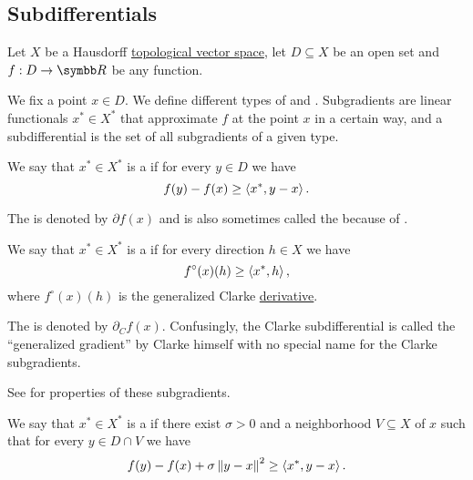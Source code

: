 \subsection{Subdifferentials}\label{subsec:subdifferentials}

Let \( X \) be a Hausdorff \hyperref[def:topological_vector_space]{topological vector space}, let \( D \subseteq X \) be an open set and \( f: D \to \BR \) be any function.

\begin{definition}\label{def:subdifferentials}
  We fix a point \( x \in D \). We define different types of  and . Subgradients are linear functionals \( x^* \in X^* \) that approximate \( f \) at the point \( x \) in a certain way, and a subdifferential is the set of all subgradients of a given type.

  \begin{defenum}
    \cite[59]{Clarke2013} We say that \( x^* \in X^* \) is a  if for every \( y \in D \) we have
    \begin{equation*}
      f(y) - f(x) \geq \left\langle x^*, y - x \right\rangle.
    \end{equation*}

    The  is denoted by \( \partial f(x) \) and is also sometimes called the  because of .

    \cite[definition 10.3]{Clarke2013} We say that \( x^* \in X^* \) is a  if for every direction \( h \in X \) we have
    \begin{equation*}
      f^\circ(x)(h) \geq \left\langle x^*, h \right\rangle,
    \end{equation*}
    where \( f^\circ(x)(h) \) is the generalized Clarke \hyperref[def:nonsmooth_derivatives/clarke]{derivative}.

    The  is denoted by \( \partial_C f(x) \). Confusingly, the Clarke subdifferential is called the \enquote{generalized gradient} by Clarke himself with no special name for the Clarke subgradients.

    See  for properties of these subgradients.

    \cite[227]{Clarke2013} We say that \( x^* \in X^* \) is a  if there exist \( \sigma > 0 \) and a neighborhood \( V \subseteq X \) of \( x \) such that for every \( y \in D \cap V \) we have
    \begin{equation*}
      f(y) - f(x) + \sigma \left\Vert y - x \right\Vert^2 \geq \left\langle x^*, y - x \right\rangle.
    \end{equation*}


\end{defenum}
\end{definition}
